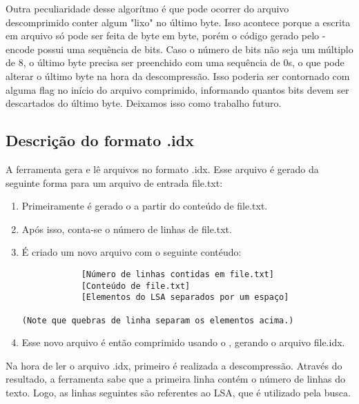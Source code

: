 Outra peculiaridade desse algorítmo é que pode ocorrer do arquivo descomprimido
conter algum "lixo" no último byte. Isso acontece porque a escrita em arquivo só
pode ser feita de byte em byte, porém o código gerado pelo \lz-encode possui uma
sequência de bits. Caso o número de bits não seja um múltiplo de 8, o último
byte precisa ser preenchido com uma sequência de 0s, o que pode alterar o último
byte na hora da descompressão. Isso poderia ser contornado com alguma flag no
início do arquivo comprimido, informando quantos bits devem ser descartados do
último byte. Deixamos isso como trabalho futuro.

\subsection{Descrição do formato .idx}

A ferramenta \ipmt gera e lê arquivos no formato .idx. Esse arquivo é gerado da
seguinte forma para um arquivo de entrada file.txt:

\begin{enumerate}

\item Primeiramente é gerado o \lsa a partir do conteúdo de file.txt.
\item Após isso, conta-se o número de linhas de file.txt.
\item É criado um novo arquivo com o seguinte contéudo:
\begin{verbatim}
            [Número de linhas contidas em file.txt]
            [Conteúdo de file.txt]
            [Elementos do LSA separados por um espaço]

(Note que quebras de linha separam os elementos acima.)
\end{verbatim}
\item Esse novo arquivo é então comprimido usando o \lz, gerando o arquivo file.idx.

\end{enumerate}

Na hora de ler o arquivo .idx, primeiro é realizada a descompressão. Através do
resultado, a ferramenta sabe que a primeira linha contém o número de linhas do
texto. Logo, as linhas seguintes são referentes ao LSA, que é utilizado pela
busca.
